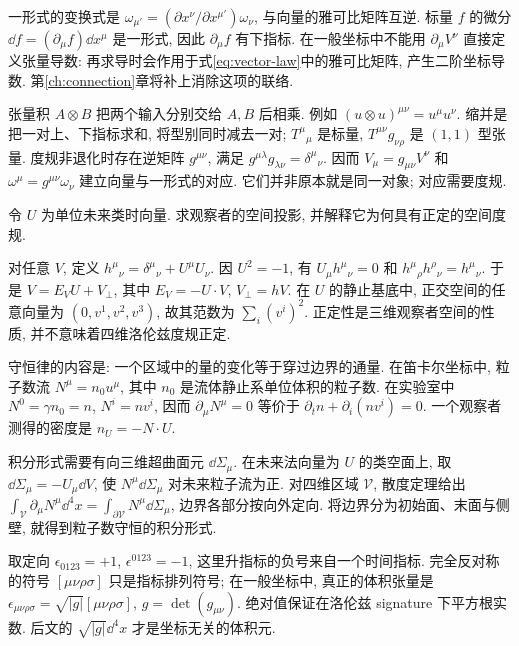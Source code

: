 一形式的变换式是 $\omega_{\mu'}=(\partial x^\nu/\partial x^{\mu'})\omega_\nu$, 与向量的雅可比矩阵互逆. 标量 $f$ 的微分 $\dd f=(\partial_\mu f)\dd x^\mu$ 是一形式, 因此 $\partial_\mu f$ 有下指标. 在一般坐标中不能用 $\partial_\mu V^\nu$ 直接定义张量导数: 再求导时会作用于式\eqref{eq:vector-law}中的雅可比矩阵, 产生二阶坐标导数. 第\ref{ch:connection}章将补上消除这项的联络.

张量积 $A\otimes B$ 把两个输入分别交给 $A,B$ 后相乘. 例如 $(u\otimes u)^{\mu\nu}=u^\mu u^\nu$. 缩并是把一对上、下指标求和, 将型别同时减去一对; $T^\mu{}_\mu$ 是标量, $T^{\mu\nu}g_{\nu\rho}$ 是 $(1,1)$ 型张量. 度规非退化时存在逆矩阵 $g^{\mu\nu}$, 满足 $g^{\mu\lambda}g_{\lambda\nu}=\delta^\mu{}_\nu$. 因而 $V_\mu=g_{\mu\nu}V^\nu$ 和 $\omega^\mu=g^{\mu\nu}\omega_\nu$ 建立向量与一形式的对应. 它们并非原本就是同一对象; 对应需要度规.

\begin{example}
令 $U$ 为单位未来类时向量. 求观察者的空间投影, 并解释它为何具有正定的空间度规.
\end{example}
\begin{solution}
对任意 $V$, 定义 $h^\mu{}_\nu=\delta^\mu{}_\nu+U^\mu U_\nu$. 因 $U^2=-1$, 有 $U_\mu h^\mu{}_\nu=0$ 和 $h^\mu{}_\rho h^\rho{}_\nu=h^\mu{}_\nu$. 于是 $V=E_V U+V_\perp$, 其中 $E_V=-U\cdot V$, $V_\perp=hV$. 在 $U$ 的静止基底中, 正交空间的任意向量为 $(0,v^1,v^2,v^3)$, 故其范数为 $\sum_i(v^i)^2$. 正定性是三维观察者空间的性质, 并不意味着四维洛伦兹度规正定.
\end{solution}

守恒律的内容是: 一个区域中的量的变化等于穿过边界的通量. 在笛卡尔坐标中, 粒子数流 $N^\mu=n_0u^\mu$, 其中 $n_0$ 是流体静止系单位体积的粒子数. 在实验室中 $N^0=\gamma n_0=n$, $N^i=nv^i$, 因而 $\partial_\mu N^\mu=0$ 等价于 $\partial_t n+\partial_i(nv^i)=0$. 一个观察者测得的密度是 $n_U=-N\cdot U$.

积分形式需要有向三维超曲面元 $\dd\Sigma_\mu$. 在未来法向量为 $U$ 的类空面上, 取 $\dd\Sigma_\mu=-U_\mu\dd V$, 使 $N^\mu\dd\Sigma_\mu$ 对未来粒子流为正. 对四维区域 $\mathcal V$, 散度定理给出 $\int_{\mathcal V}\partial_\mu N^\mu\dd^4x=\int_{\partial\mathcal V}N^\mu\dd\Sigma_\mu$, 边界各部分按向外定向. 将边界分为初始面、末面与侧壁, 就得到粒子数守恒的积分形式.

取定向 $\epsilon_{0123}=+1$, $\epsilon^{0123}=-1$, 这里升指标的负号来自一个时间指标. 完全反对称的符号 $[\mu\nu\rho\sigma]$ 只是指标排列符号; 在一般坐标中, 真正的体积张量是 $\epsilon_{\mu\nu\rho\sigma}=\sqrt{|g|}[\mu\nu\rho\sigma]$, $g=\det(g_{\mu\nu})$. 绝对值保证在洛伦兹 signature 下平方根实数. 后文的 $\sqrt{|g|}\dd^4x$ 才是坐标无关的体积元.

